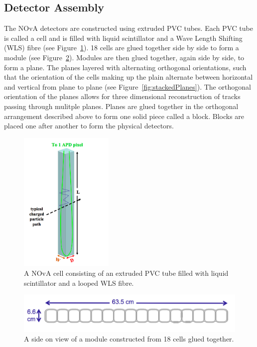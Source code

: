 \subsection{Detector Assembly}

The NOvA detectors are constructed using extruded PVC tubes. Each PVC
tube is called a cell and is filled with liquid scintillator and a
Wave Length Shifting (WLS) fibre (see Figure~\ref{fig:cell}). 
18 cells are glued together side by side to form a module (see
Figure~\ref{fig:module}). Modules are then glued together, again side
by side,
to form a plane. The planes layered with alternating orthogonal
orientations, such that the orientation of the cells making up the
plain alternate between horizontal and vertical from plane to plane (see
Figure~\ref{fig:stackedPlanes}). The orthogonal
orientation of the planes allows for three dimensional reconstruction
of tracks passing through mulitple planes. Planes are glued together
in the orthogonal arrangement described above to form one solid piece
called a block. Blocks are placed one after another to form the
physical detectors.




\begin{figure}
  \centering
  \includegraphics[width=0.4\textwidth]{../../img/det/gen/nova_cell.png}
  \caption{A NOvA cell consisting of an extruded
    PVC tube filled with liquid scintillator and a looped WLS fibre.}
  \label{fig:cell}
\end{figure}


\begin{figure}
  \centering
  \includegraphics[width=1\textwidth]{../../img/det/gen/extru_cross_section.png}
  \caption{A side on view of a module constructed from 18 cells glued
    together.}
  \label{fig:module}
\end{figure}

